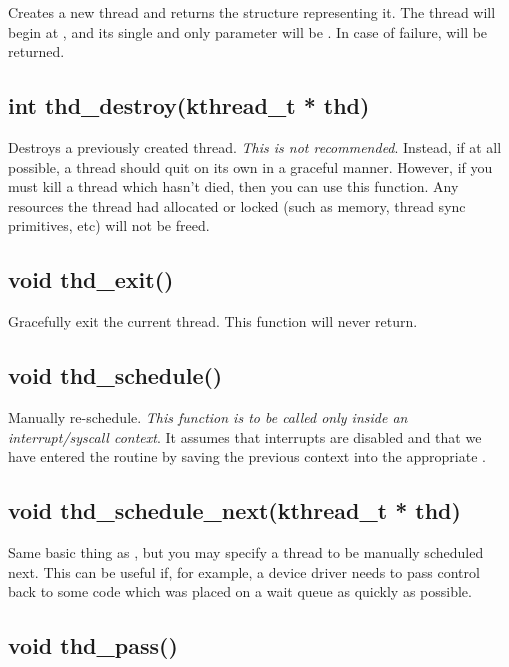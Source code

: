\documentclass[english]{report}
\begin{document}
Creates a new thread and returns the  structure representing
it. The thread will begin at , and its single and only
parameter will be . In case of failure,  will be returned.


\subsection{int thd\_destroy(kthread\_t * thd)}

Destroys a previously created thread. \emph{This is not recommended}.
Instead, if at all possible, a thread should quit on its own in a
graceful manner. However, if you must kill a thread which hasn't died,
then you can use this function. Any resources the thread had allocated
or locked (such as memory, thread sync primitives, etc) will not be
freed.


\subsection{void thd\_exit()}

Gracefully exit the current thread. This function will never return.


\subsection{void thd\_schedule()}

Manually re-schedule. \emph{This function is to be called only inside
an interrupt/syscall context}. It assumes that interrupts are disabled
and that we have entered the routine by saving the previous context
into the appropriate .


\subsection{void thd\_schedule\_next(kthread\_t * thd)}

Same basic thing as , but you may specify a
thread to be manually scheduled next. This can be useful if, for example,
a device driver needs to pass control back to some code which was
placed on a wait queue as quickly as possible.


\subsection{void thd\_pass()}
\end{document}

